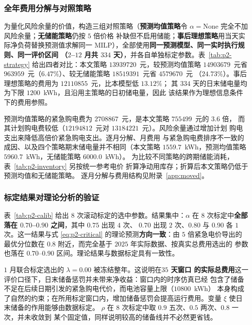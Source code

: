 \documentclass[withoutpreface,bwprint]{cumcmthesis}
\begin{document}
\subsubsection{全年费用分解与对照策略}

为量化风险余量的价值，构造三组对照策略（\textbf{预测均值策略}令
$\alpha=\text{None}$ 完全不加风险余量；\textbf{无储能策略}仍按 $5$ 倍价格
补缺但不启用储能；\textbf{事后理想策略}用当天实际净负荷替换预测值求解同一
MILP），全部使用\textbf{同一预测模型、同一实时执行规则、同一评价区间
（$2$--$12$ 月共 $334$ 天）}，并各自单独标定参数。表~\ref{tab:p2-strategy}
给出四者对比：本文策略 $13939720$~元，较预测均值策略 $14903679$~元省
$963959$~元（$6.47\%$）、较无储能策略 $18519391$~元省 $4579670$~元
（$24.73\%$）。事后理想策略的费用为 $12110855$~元，比本模型低 $13.12\%$；
其 $334$ 天的日末储电量均为下限 $1200$~kWh，且沿用主策略的日初储电量，因此
该结果作为理想信息条件下的费用参照。

预测均值策略的紧急购电费为 $2708867$~元，是本文策略 $755499$~元的 $3.6$ 倍，
而其计划购电费较低（$12194812$~元对 $13184221$~元）。风险余量通过增加计划
购电支出来降低高倍价紧急购电支出。逐月分解、月费用
与紧急购电费排序不一致的成因、以及四个策略期末储电量并不相同（本文策略
$1559.7$~kWh，预测均值策略 $5960.7$~kWh，无储能策略 $6000.0$~kWh）。
为比较不同策略的跨期储能消耗，表~\ref{tab:p2-inventory} 另按统一参考电价
折算净动用库存；折算后本文策略仍低于预测均值和无储能策略。
逐月分解与费用结构见附录~\ref{app:moved}。

\subsubsection{标定结果对理论分析的验证}

表~\ref{tab:p2-calib} 给出 $8$ 次滚动标定的选中参数。结果集中：$\alpha$ 在
$8$ 次标定中\textbf{全部落在 $0.70$--$0.90$ 之间}，其中 $0.75$ 出现 $4$ 次、
$0.70$ 出现 $2$ 次、$0.80$ 与 $0.90$ 各 $1$ 次。这一结果与式
\eqref{eq:p2-critical} 的理论预测\textbf{方向一致}：由 $5$ 倍紧急电价导出的
最优分位数在 $0.8$ 附近，而完全基于 $2025$ 年实际数据、按真实总费用选出的
参数也落在 $0.70$--$0.90$ 区间。理论结果与数据标定具有一致性。

$1$ 月联合标定选出的 $\lambda=0.00$ 被冻结整年。这说明在\textbf{$35$ 天窗口
的实际总费用}这一评价口径下，日末储备惩罚并未带来净收益：窗口内的时序仿真已经
包含了储备不足在后续日期引发的紧急购电代价，而电池容量上限（$10800$~kWh）
本身构成了自然的约束；在所用标定窗口内，增加储备惩罚会提高运行费用。变量
$\xi$ 使日末储备的作用能够由数据标定。
$\rho$ 在 $8$ 次标定中取 $0.9$ 五次、$0.5$ 两次、$0.8$ 一次，并未收敛到
某个固定值，同样说明较高的储备线并不必然更省钱。
\end{document}
